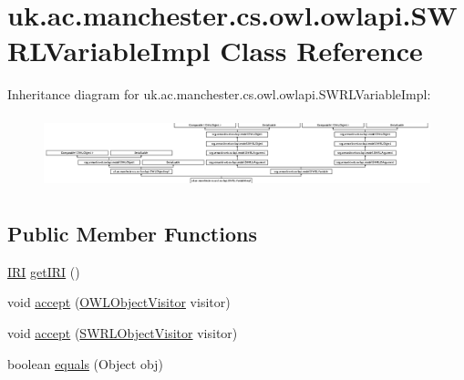 \hypertarget{classuk_1_1ac_1_1manchester_1_1cs_1_1owl_1_1owlapi_1_1_s_w_r_l_variable_impl}{\section{uk.\-ac.\-manchester.\-cs.\-owl.\-owlapi.\-S\-W\-R\-L\-Variable\-Impl Class Reference}
\label{classuk_1_1ac_1_1manchester_1_1cs_1_1owl_1_1owlapi_1_1_s_w_r_l_variable_impl}
}
Inheritance diagram for uk.\-ac.\-manchester.\-cs.\-owl.\-owlapi.\-S\-W\-R\-L\-Variable\-Impl\-:\begin{figure}[H]
\begin{center}
\leavevmode
\includegraphics[height=2.121212cm]{classuk_1_1ac_1_1manchester_1_1cs_1_1owl_1_1owlapi_1_1_s_w_r_l_variable_impl}
\end{center}
\end{figure}
\subsection*{Public Member Functions}
\begin{DoxyCompactItemize}
\item 
\hyperlink{classorg_1_1semanticweb_1_1owlapi_1_1model_1_1_i_r_i}{I\-R\-I} \hyperlink{classuk_1_1ac_1_1manchester_1_1cs_1_1owl_1_1owlapi_1_1_s_w_r_l_variable_impl_acd81f18444d37a39a5b6ac84c2a685df}{get\-I\-R\-I} ()
\item 
void \hyperlink{classuk_1_1ac_1_1manchester_1_1cs_1_1owl_1_1owlapi_1_1_s_w_r_l_variable_impl_a921087ae088797aad4babca25cf18633}{accept} (\hyperlink{interfaceorg_1_1semanticweb_1_1owlapi_1_1model_1_1_o_w_l_object_visitor}{O\-W\-L\-Object\-Visitor} visitor)
\item 
void \hyperlink{classuk_1_1ac_1_1manchester_1_1cs_1_1owl_1_1owlapi_1_1_s_w_r_l_variable_impl_a0d5435798f57a5c7d72c26b78e5c6ce3}{accept} (\hyperlink{interfaceorg_1_1semanticweb_1_1owlapi_1_1model_1_1_s_w_r_l_object_visitor}{S\-W\-R\-L\-Object\-Visitor} visitor)
\item 
boolean \hyperlink{classuk_1_1ac_1_1manchester_1_1cs_1_1owl_1_1owlapi_1_1_s_w_r_l_variable_impl_a2880889e1206768e8db13e0598560e36}{equals} (Object obj)
\end{DoxyCompactItemize}
